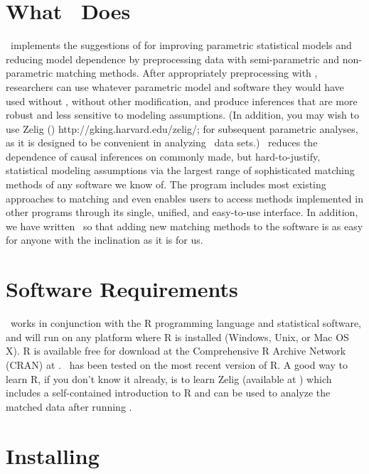 
\section{What \MatchIt\ Does}

\MatchIt\ implements the suggestions of \citet*{HoImaKin07} for
improving parametric statistical models and reducing model dependence
by preprocessing data with semi-parametric and non-parametric matching
methods.  After appropriately preprocessing with \MatchIt, researchers
can use whatever parametric model and software they would have used
without \MatchIt, without other modification, and produce inferences
that are more robust and less sensitive to modeling assumptions.  (In
addition, you may wish to use Zelig
()
{http://gking.harvard.edu/zelig/}; \citealt{ImaKinLau06} for
subsequent parametric analyses, as it is designed to be convenient in
analyzing \MatchIt\ data sets.)  \MatchIt\ reduces the dependence of
causal inferences on commonly made, but hard-to-justify, statistical
modeling assumptions via the largest range of sophisticated matching
methods of any software we know of.  The program includes most
existing approaches to matching and even enables users to access
methods implemented in other programs through its single, unified, and
easy-to-use interface.  In addition, we have written \MatchIt\ so
that adding new matching methods to the software is as easy for anyone
with the inclination as it is for us.

\section{Software Requirements} 
\label{sec:require}

\MatchIt\ works in conjunction with the R programming language and
statistical software, and will run on any platform where R is
installed (Windows, Unix, or Mac OS X).  R is available free for
download at the Comprehensive R Archive Network (CRAN) at
.
\MatchIt\ has been tested on the most recent version of R.  A good way
to learn R, if you don't know it already, is to learn Zelig (available
at
)
which includes a self-contained introduction to R and can be used to
analyze the matched data after running \MatchIt.

\section{Installing \MatchIt}
\label{sec:install}

